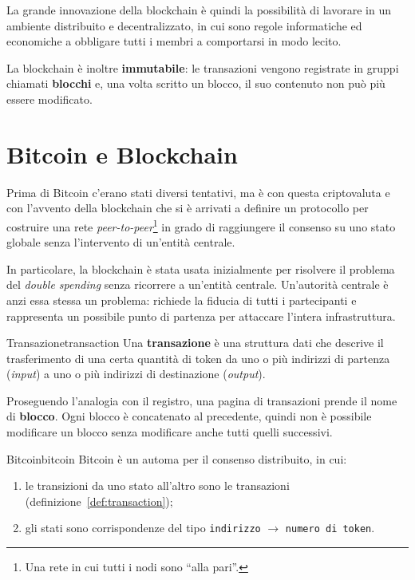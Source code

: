 \documentclass[a4paper, 11pt, oneside]{book}
\newcommand{\cod}[1]{\texttt{#1}} %
\begin{document}
	La grande innovazione della blockchain è quindi la possibilità di lavorare in un
	ambiente distribuito e decentralizzato, in cui sono regole informatiche ed
	economiche a obbligare tutti i membri a comportarsi in modo lecito.

	La blockchain è inoltre \textbf{immutabile}: le transazioni vengono registrate in
	gruppi chiamati \textbf{blocchi} e, una volta scritto un blocco, il suo contenuto
	non può più essere modificato.

	\section{Bitcoin e Blockchain}
	Prima di Bitcoin c'erano stati diversi tentativi, ma è con questa criptovaluta e
	con l'avvento della blockchain che si è arrivati a definire un protocollo per
	costruire una rete \textit{peer-to-peer}\footnote{Una rete in cui tutti i nodi sono
	``alla pari''.} in grado di raggiungere il consenso su uno stato globale senza
	l'intervento di un'entità centrale.

	In particolare, la blockchain è stata usata inizialmente per risolvere il problema
	del \textit{double spending} senza ricorrere a un'entità centrale. Un'autorità
	centrale è anzi essa stessa un problema: richiede la fiducia di tutti i
	partecipanti e rappresenta un possibile punto di partenza per attaccare l'intera
	infrastruttura.

	\begin{definizione}{Transazione}{transaction}
		Una \textbf{transazione} è una struttura dati che descrive il trasferimento di
		una certa quantità di token da uno o più indirizzi di partenza (\textit{input})
		a uno o più indirizzi di destinazione (\textit{output}).
	\end{definizione}

	Proseguendo l'analogia con il registro, una pagina di transazioni prende il nome
	di \textbf{blocco}. Ogni blocco è concatenato al precedente, quindi non è possibile
	modificare un blocco senza modificare anche tutti quelli successivi.

	\begin{definizione}{Bitcoin}{bitcoin}
		Bitcoin è un automa per il consenso distribuito, in cui:
		\begin{enumerate}
			\item le transizioni da uno stato all'altro sono le transazioni
				(definizione~\ref{def:transaction});
			\item gli stati sono corrispondenze del tipo
				\cod{indirizzo} $\rightarrow$ \cod{numero di token}.
		\end{enumerate}
	\end{definizione}
\end{document}
